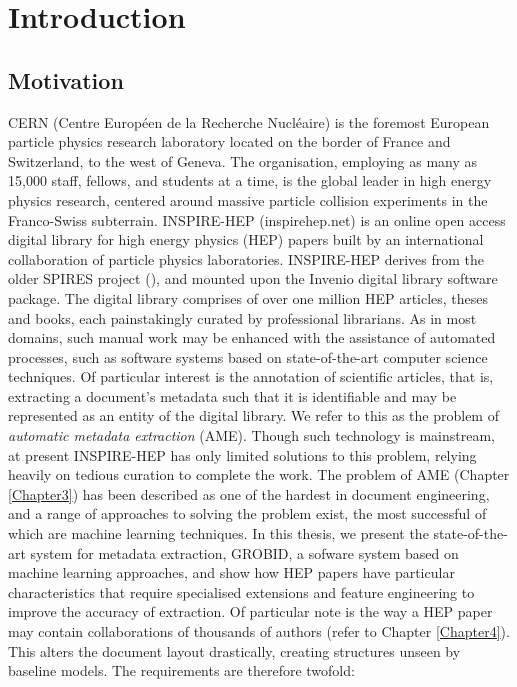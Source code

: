 
\chapter{Introduction} %

\label{Chapter1} %



\section{Motivation}

CERN (Centre Europ\'een de la Recherche Nucl\'eaire) is the foremost European particle physics research laboratory located on the border of France and Switzerland, to the west of Geneva. The organisation, employing as many as 15,000 staff, fellows, and students at a time, is the global leader in high energy physics research, centered around massive particle collision experiments in the Franco-Swiss subterrain. INSPIRE-HEP (inspirehep.net) is an online open access digital library for high energy physics (HEP) papers built by an international collaboration of particle physics laboratories. INSPIRE-HEP derives from the older SPIRES project (\cite{gentil2009information}), and mounted upon the Invenio digital library software package. The digital library comprises of over one million HEP articles, theses and books, each painstakingly curated by professional librarians. As in most domains, such manual work may be enhanced with the assistance of automated processes, such as software systems based on state-of-the-art computer science techniques. Of particular interest is the annotation of scientific articles, that is, extracting a document's metadata such that it is identifiable and may be represented as an entity of the digital library. We refer to this as the problem of \emph{automatic metadata extraction} (AME). Though such technology is mainstream, at present INSPIRE-HEP has only limited solutions to this problem, relying heavily on tedious curation to complete the work. The problem of AME (Chapter \ref{Chapter3}) has been described as one of the hardest in document engineering, and a range of approaches to solving the problem exist, the most successful of which are machine learning techniques. In this thesis, we present the state-of-the-art system for metadata extraction, GROBID, a sofware system based on machine learning approaches, and show how HEP papers have particular characteristics that require specialised extensions and feature engineering to improve the accuracy of extraction. Of particular note is the way a HEP paper may contain collaborations of thousands of authors (refer to Chapter \ref{Chapter4}). This alters the document layout drastically, creating structures unseen by baseline models. The requirements are therefore twofold:

